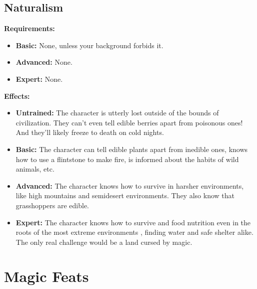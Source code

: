 \documentclass[openany,10pt,a4paper]{book}
\begin{document}
\subsection{Naturalism}
\begin{table}[!ht]
\centering
{}
\end{table}
\textbf{Requirements:}
\begin{itemize}
	\item \textbf{Basic:} None, unless your background forbids it.
	\item \textbf{Advanced:} None.
	\item \textbf{Expert:} None.
\end{itemize}
\textbf{Effects:}
\begin{itemize}
	\item \textbf{Untrained:} The character is utterly lost outside of the bounds of civilization. They can't even tell edible berries apart from poisonous ones! And they'll likely freeze to death on cold nights.
	\item \textbf{Basic:} The character can tell edible plants apart from inedible ones, knows how to use a flintstone to make fire, is informed about the habits of wild animals, etc.
	\item \textbf{Advanced:} The character knows how to survive in harsher environments, like high mountains and semidesert environments. They also know that grasshoppers are edible.
	\item \textbf{Expert:} The character knows how to survive and food nutrition even in the roots of the most extreme environments , finding water and safe shelter alike. The only real challenge would be a land cursed by magic.
\end{itemize}\newpage
\section{Magic Feats}
\end{document}
